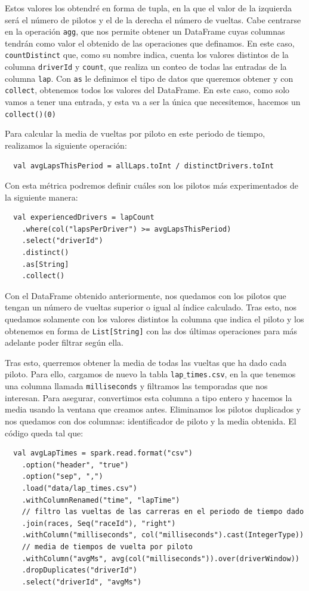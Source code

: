 \documentclass[12pt,twoside,titlepage]{report}
\begin{document}
Estos valores los obtendré en forma de tupla, en la que el valor de la izquierda será el número de pilotos y el de la derecha el número de vueltas. Cabe centrarse en la operación \texttt{agg}, que nos permite obtener un DataFrame cuyas columnas tendrán como valor el obtenido de las operaciones que definamos. En este caso, \texttt{countDistinct} que, como su nombre indica, cuenta los valores distintos de la columna \texttt{driverId} y \texttt{count}, que realiza un conteo de todas las entradas de la columna \texttt{lap}. Con \texttt{as} le definimos el tipo de datos que queremos obtener y con \texttt{collect}, obtenemos todos los valores del DataFrame. En este caso, como solo vamos a tener una entrada, y esta va a ser la única que necesitemos, hacemos un \texttt{collect()(0)}

Para calcular la media de vueltas por piloto en este periodo de tiempo, realizamos la siguiente operación:

\begin{lstlisting}
  val avgLapsThisPeriod = allLaps.toInt / distinctDrivers.toInt
\end{lstlisting}

Con esta métrica podremos definir cuáles son los pilotos más experimentados de la siguiente manera:

\begin{lstlisting}
  val experiencedDrivers = lapCount
    .where(col("lapsPerDriver") >= avgLapsThisPeriod)
    .select("driverId")
    .distinct()
    .as[String]
    .collect()
\end{lstlisting}

Con el DataFrame obtenido anteriormente, nos quedamos con los pilotos que tengan un número de vueltas superior o igual al índice calculado. Tras esto, nos quedamos solamente con los valores distintos la columna que indica el piloto y los obtenemos en forma de \texttt{List[String]} con las dos últimas operaciones para más adelante poder filtrar según ella.

Tras esto, querremos obtener la media de todas las vueltas que ha dado cada piloto. Para ello, cargamos de nuevo la tabla \texttt{lap$\_$times.csv}, en la que tenemos una columna llamada \texttt{milliseconds} y filtramos las temporadas que nos interesan. Para asegurar, convertimos esta columna a tipo entero y hacemos la media usando la ventana que creamos antes. Eliminamos los pilotos duplicados y nos quedamos con dos columnas: identificador de piloto y la media obtenida. El código queda tal que:

\begin{lstlisting}
  val avgLapTimes = spark.read.format("csv")
    .option("header", "true")
    .option("sep", ",")
    .load("data/lap_times.csv")
    .withColumnRenamed("time", "lapTime")
    // filtro las vueltas de las carreras en el periodo de tiempo dado
    .join(races, Seq("raceId"), "right")
    .withColumn("milliseconds", col("milliseconds").cast(IntegerType))
    // media de tiempos de vuelta por piloto
    .withColumn("avgMs", avg(col("milliseconds")).over(driverWindow))
    .dropDuplicates("driverId")
    .select("driverId", "avgMs")
\end{lstlisting}
\end{document}
